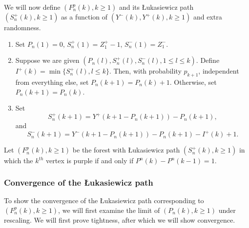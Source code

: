 We will now define $(F_n^p(k),k\geq 1)$ and its \L ukasiewicz path $(S_n^{+}(k), k\geq 1)$ as a function of $(Y^-(k), Y^+(k) ,k\geq 1)$ and extra randomness.
\begin{enumerate} 
    \item Set $P_n(1)=0$, $S_n^{+}(1)=Z_1^+-1$, $S_n^{-}(1)=Z_1^-$. 
    \item Suppose we are given $(P_n(l),S_n^{+}(l),S_n^{-}(l), 1\leq l \leq k)$. Define 
    $I^{+}(k)=\min\{S_n^{+}(l), l\leq k\}$. Then, with probability $p_{k+1}$, independent from everything else, set $P_n(k+1)=P_n(k)+1$. Otherwise, set $P_n(k+1)=P_n(k)$. 
    \item Set $$S_n^{+}(k+1)=Y^+(k+1-P_n(k+1))-P_n(k+1),$$ and $$S_n^{-}(k+1)=Y^-(k+1-P_n(k+1))-P_n(k+1)-I^{+}(k)+1.$$
\end{enumerate}
Let $(F^p_n(k),k\geq 1)$ be the forest with \L ukasiewicz path $(S_n^{+}(k), k\geq 1)$ in which the $k^{th}$ vertex is purple if and only if $P^n(k)-P^n(k-1)=1$. 
\subsubsection{Convergence of the \L ukasiewicz path}
To show the convergence of the \L ukasiewicz path corresponding to $(F^p_n(k),k\geq 1)$, we will first examine the limit of $(P_n(k), k\geq 1)$ under rescaling. We will first prove tightness, after which we will show convergence.


